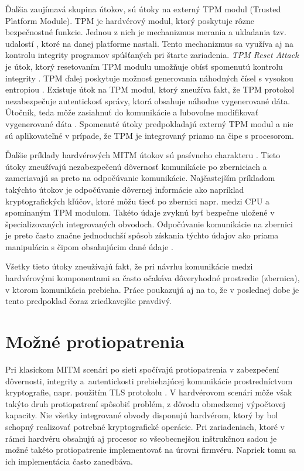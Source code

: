 Ďalšia zaujímavá skupina útokov, sú útoky na externý TPM modul (Trusted Platform Module). TPM je hardvérový modul, ktorý poskytuje rôzne bezpečnostné funkcie. Jednou z nich je mechanizmus merania a ukladania tzv. udalostí \cite{tpmArch}, ktoré na danej platforme nastali. Tento mechanizmus sa využíva aj na kontrolu integrity programov spúšťaných pri štarte zariadenia. \textit{TPM Reset Attack} je útok, ktorý resetovaním TPM modulu umožňuje obísť spomenutú kontrolu integrity \cite{mitmTPM}. TPM ďalej poskytuje možnosť generovania náhodných čísel s vysokou entropiou \cite{tpmArch}. Existuje útok na TPM modul, ktorý zneužíva fakt, že TPM protokol nezabezpečuje autentickosť správy, ktorá obsahuje náhodne vygenerované dáta. Útočník, teda môže zasiahnuť do komunikácie a ľubovoľne modifikovať vygenerované dáta \cite{mitmTPM}. Spomenuté útoky predpokladajú externý TPM modul a nie sú aplikovateľné v prípade, že TPM je integrovaný priamo na čipe s procesorom.

Ďalšie príklady hardvérových MITM útokov sú pasívneho charakteru \cite{mitmI2C, mitmBitlocker}. Tieto útoky zneužívajú nezabezpečenú dôvernosť komunikácie po zberniciach a zameriavajú sa preto na odpočúvanie komunikácie. Najčastejším príkladom takýchto útokov je odpočúvanie dôvernej informácie ako napríklad kryptografických kľúčov, ktoré môžu tiecť po zbernici napr. medzi CPU a spomínaným TPM modulom. Takéto údaje zvyknú byť bezpečne uložené v špecializovaných integrovaných obvodoch. Odpočúvanie komunikácie na zbernici je preto často značne jednoduchší spôsob získania týchto údajov ako priama manipulácia s čipom obsahujúcim dané údaje \cite{mitmBitlocker}.

Všetky tieto útoky zneužívajú fakt, že pri návrhu komunikácie medzi hardvérovými komponentami sa často očakáva dôveryhodné prostredie (zbernica), v ktorom komunikácia prebieha. Práce poukazujú aj na to, že v poslednej dobe je tento predpoklad čoraz zriedkavejšie pravdivý.

\section{Možné protiopatrenia}
Pri klasickom MITM scenári po sieti spočívajú protiopatrenia v zabezpečení dôvernosti, integrity a~autentickosti prebiehajúcej komunikácie prostredníctvom kryptografie, napr. použitím TLS protokolu \cite{mitmTheory}. V hardvérovom scenári môže však takýto druh protiopatrení spôsobiť problém, z dôvodu obmedzenej výpočtovej kapacity. Nie všetky integrované obvody disponujú hardvérom, ktorý by bol schopný realizovať potrebné kryptografické operácie. Pri zariadeniach, ktoré v rámci hardvéru obsahujú aj procesor so všeobecnejšou inštrukčnou sadou je možné takéto protiopatrenie implementovať na úrovni firmvéru. Napriek tomu sa ich implementácia často zanedbáva.

